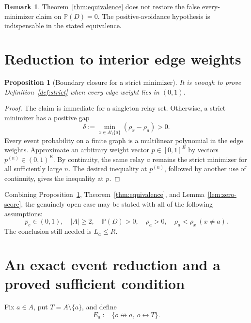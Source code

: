 \documentclass[11pt]{article}
\newtheorem{proposition}[theorem]{Proposition}
\theoremstyle{definition}
\newtheorem{remark}[theorem]{Remark}
\newcommand{\PP}{\mathbb P}
\newcommand{\con}{\leftrightarrow}
\newcommand{\ncon}{\nleftrightarrow}
\newcommand{\1}{\mathbf 1}
\begin{document}
\begin{remark}
Theorem~\ref{thm:equivalence} does not restore the false every-minimizer
claim on \(\PP(D)=0\).  The positive-avoidance hypothesis is indispensable
in the stated equivalence.
\end{remark}

\section{Reduction to interior edge weights}

\begin{proposition}[Boundary closure for a strict minimizer]
\label{prop:interior}
It is enough to prove Definition~\ref{def:strict} when every edge weight
lies in \((0,1)\).
\end{proposition}

\begin{proof}
The claim is immediate for a singleton relay set.  Otherwise, a strict
minimizer has a positive gap
\[
 \delta:=\min_{x\in A\setminus\{a\}}(\rho_x-\rho_a)>0.
\]
Every event probability on a finite graph is a multilinear polynomial in
the edge weights.  Approximate an arbitrary weight vector \(p\in[0,1]^E\)
by vectors \(p^{(n)}\in(0,1)^E\).  By continuity, the same relay \(a\)
remains the strict minimizer for all sufficiently large \(n\).  The desired
inequality at \(p^{(n)}\), followed by another use of continuity, gives the
inequality at \(p\).
\end{proof}

Combining Proposition~\ref{prop:interior}, Theorem~\ref{thm:equivalence},
and Lemma~\ref{lem:zero-score}, the genuinely open case may be stated with
all of the following assumptions:
\begin{equation}\label{eq:open-core-assumptions}
 p_e\in(0,1),\quad |A|\ge2,\quad \PP(D)>0,\quad \rho_a>0,
 \quad \rho_a<\rho_x\ (x\ne a).
\end{equation}
The conclusion still needed is \(L_a\le R\).

\section{An exact event reduction and a proved sufficient condition}

Fix \(a\in A\), put \(T=A\setminus\{a\}\), and define
\begin{equation}\label{eq:Ea}
 E_a:=\{o\ncon a,\ o\con T\}.
\end{equation}
\end{document}
